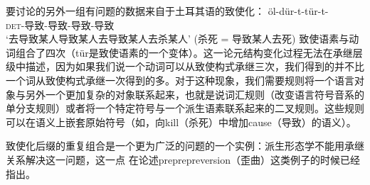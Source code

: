 要讨论的另外一组有问题的数据来自于土耳其语的致使化\citep[]{Lewis67a-u}：
\ea
\gll öl-dür-t-tür-t- \\
\textsc{det}-导致-导致-导致-导致\\
\glt `去导致某人导致某人去导致某人去杀某人'
(杀死 = 导致某人去死)
\z
致使语素与动词组合了四次（tür是致使语素的一个变体）。这一论元结构变化过程无法在承继层级中描述，因为如果我们说一个动词可以从致使构式承继三次，我们得到的并不比一个词从致使构式承继一次得到的多。对于这种现象，我们需要规则将一个语言对象与另外一个更加复杂的对象联系起来，也就是说词汇规则（改变语言符号音系的单分支规则）或者将一个特定符号与一个派生语素联系起来的二叉规则。这些规则可以在语义上嵌套原始符号（如，向kill（杀死）中增加cause（导致）的语义）。

致使化后缀的重复组合是一个更为广泛的问题的一个实例：派生形态学不能用承继关系解决这一问题，这一点 \citet{KN93a}在论述preprepreversion（歪曲）这类例子的时候已经指出。

